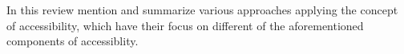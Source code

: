 
In this review \citet{Geurs2004AccessibilityReview} mention and summarize various approaches applying the concept of accessibility, which have their focus on different of the aforementioned components of accessiblity.

